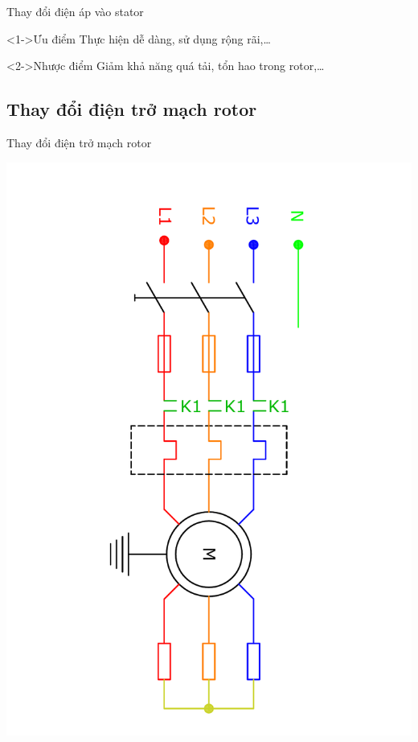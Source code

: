 \documentclass[20pt]{beamer}
\begin{document}
\begin{frame}{Thay đổi điện áp vào stator}
	\begin{block}<1->{Ưu điểm}
		\justifying
		Thực hiện dễ dàng, sử dụng rộng rãi,\ldots
   \end{block}
   
   \begin{block}<2->{Nhược điểm}
   		\justifying
   		Giảm khả năng quá tải, tổn hao trong rotor,\ldots
   \end{block}
\end{frame}

\subsection*{Thay đổi điện trở mạch rotor}
\begin{frame}{Thay đổi điện trở mạch rotor}
	\vspace{-2.5cm}
	\begin{center}
		\includegraphics[scale=0.4, angle = 90]{../sodomach/dieu-chinh-dien-tro-rotor.pdf}
	\end{center}
\end{frame}
\end{document}
